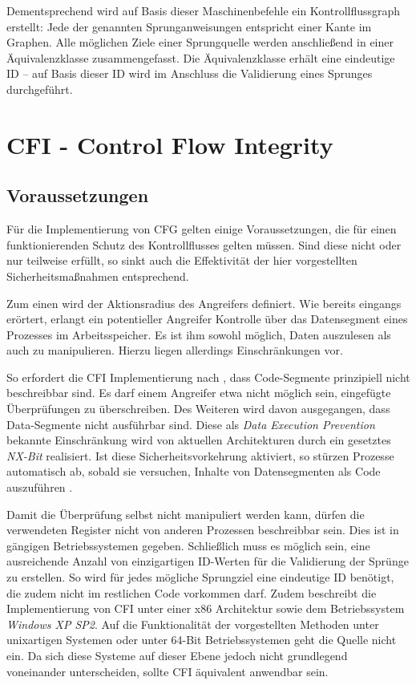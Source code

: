 \documentclass[12pt,%
               oneside,
               a4paper]{uiothesis}
\begin{document}
Dementsprechend wird auf Basis dieser Maschinenbefehle ein Kontrollflussgraph erstellt: Jede der genannten Sprunganweisungen entspricht einer Kante im Graphen. Alle möglichen Ziele einer Sprungquelle werden anschließend in einer Äquivalenzklasse zusammengefasst. Die Äquivalenzklasse erhält eine eindeutige ID -- auf Basis dieser ID wird im Anschluss die Validierung eines Sprunges durchgeführt.


\section{CFI - Control Flow Integrity}
\subsection{Voraussetzungen}
\label{sec:voraussetzungen}

Für die Implementierung von CFG gelten einige Voraussetzungen, die für einen funktionierenden Schutz des Kontrollflusses gelten müssen. Sind diese nicht oder nur teilweise erfüllt, so sinkt auch die Effektivität der hier vorgestellten Sicherheitsmaßnahmen entsprechend.

Zum einen wird der Aktionsradius des Angreifers definiert. Wie bereits eingangs erörtert, erlangt ein potentieller Angreifer Kontrolle über das Datensegment eines Prozesses im Arbeitsspeicher. Es ist ihm sowohl möglich, Daten auszulesen als auch zu manipulieren. Hierzu liegen allerdings Einschränkungen vor.

So erfordert die CFI Implementierung nach \cite{Abadi.2009}, dass Code-Segmente prinzipiell nicht beschreibbar sind. Es darf einem Angreifer etwa nicht möglich sein, eingefügte Überprüfungen zu überschreiben. Des Weiteren wird davon ausgegangen, dass Data-Segmente nicht ausführbar sind. Diese als \emph{Data Execution Prevention} bekannte Einschränkung wird von aktuellen Architekturen durch ein gesetztes \emph{NX-Bit} realisiert. Ist diese Sicherheitsvorkehrung aktiviert, so stürzen Prozesse automatisch ab, sobald sie versuchen, Inhalte von Datensegmenten als Code auszuführen \cite{Goktas.}.

Damit die Überprüfung selbst nicht manipuliert werden kann, dürfen die verwendeten Register nicht von anderen Prozessen beschreibbar sein. Dies ist in gängigen Betriebssystemen gegeben.
Schließlich muss es möglich sein, eine ausreichende Anzahl von einzigartigen ID-Werten für die Validierung der Sprünge zu erstellen. So wird für jedes mögliche Sprungziel eine eindeutige ID benötigt, die zudem nicht im restlichen Code vorkommen darf. Zudem beschreibt \cite{Abadi.2009} die Implementierung von CFI unter einer x86 Architektur sowie dem Betriebssystem \emph{Windows XP SP2}. Auf die Funktionalität der vorgestellten Methoden unter unixartigen Systemen oder unter 64-Bit Betriebssystemen geht die Quelle nicht ein. Da sich diese Systeme auf dieser Ebene jedoch nicht grundlegend voneinander unterscheiden, sollte CFI äquivalent anwendbar sein.
\end{document}
